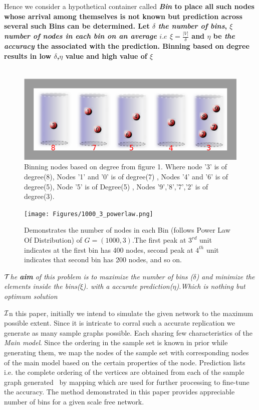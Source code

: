 \documentclass{article}
\begin{document}
Hence we consider a hypothetical container called \bf \emph{Bin} \rm to place all such nodes whose arrival among themselves is not known but prediction across several such Bins can be determined. Let $ \delta $ \emph{\textbf{the number of bins}}, $\xi $ \textbf{\emph{number of nodes in each bin on an average}} $ i.e $ $\xi = \frac {|V|}{\delta}$ and  $\eta$ be \emph{\textbf{the accuracy}} the associated with the prediction. Binning based on degree results in low $\delta$,$\eta$ value and high value of $\xi$   
\\\
\begin{figure}[htp]
\centering
\includegraphics[scale=0.35]{Figures/bins.png}
\caption{Binning nodes based on degree from figure 1. Where node '3' is of degree(8), Nodes '1' and '0' is of degree(7) , Nodes '4' and '6' is of degree(5), Node '5' is of Degree(5) , Nodes '9','8','7','2' is of degree(3).}
\label{}
\end{figure}
\begin{figure}[htp]
\centering
\texttt{[image: Figures/1000\_3\_powerlaw.png]}
\caption{Demonstrates the number of nodes in each Bin (follows Power Law Of Distribution) of $G = (1000, 3)$.The first peak at $3^{rd}$ unit indicates at the first bin has 400 nodes, second peak at $4^{th}$ unit indicates that second bin has 200 nodes, and so on.}
\label{}
\end{figure}

\emph{$\cal T$he \emph{\textbf{aim}} of this problem is to maximize the number of bins ($\delta$) and minimize the elements inside the bins($\xi$). with a accurate prediction($\eta$).Which is nothing but optimum solution
}

\newpage 

$\cal I$n this paper,  initially we intend to simulate the given network to the maximum possible extent. Since it is intricate to corral such a accurate replication we generate as many sample graphs possible. Each sharing few characteristics of the \emph{Main model}. Since the ordering in the sample set is known in prior while generating them, we map the nodes of the sample set with corresponding nodes of the main model based on the certain properties of the node. Prediction lists i.e. the complete ordering of the vertices are obtained from each of the sample graph generated  by mapping which are used for further processing to fine-tune the accuracy. The method demonstrated in this paper provides appreciable number of bins for a given scale free network.
\end{document}

